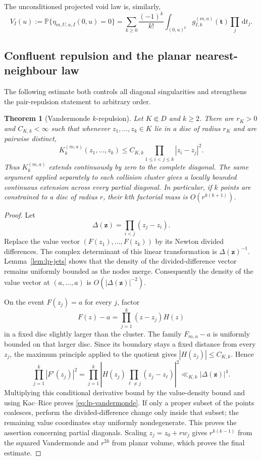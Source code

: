 \documentclass[11pt]{article}
\newtheorem{theorem}{Theorem}[section]
\theoremstyle{definition}
\theoremstyle{remark}
\newcommand{\dd}{\,\mathrm d}
\begin{document}
The unconditioned projected void law is, similarly,
\begin{equation}
 V_I(u):={\mathbb P}\{\eta_{m,U,a,I}(0,u)=0\}
 =\sum_{k\geq0}\frac{(-1)^k}{k!}
   \int_{(0,u)^k}g_{I,k}^{(m,a)}(\mathbf t)\prod_j\dd t_j.
 \label{eq:lp-projected-void}
\end{equation}

\subsection{Confluent repulsion and the planar nearest-neighbour law}

The following estimate both controls all diagonal singularities and strengthens
the pair-repulsion statement to arbitrary order.

\begin{theorem}[Vandermonde $k$-repulsion]
\label{thm:lp-vandermonde}
Let $K\Subset D$ and $k\geq2$.  There are $r_K>0$ and $C_{K,k}<\infty$ such
that whenever $z_1,\ldots,z_k\in K$ lie in a disc of radius $r_K$ and are
pairwise distinct,
\begin{equation}
 \boxed{
 K_k^{(m,a)}(z_1,\ldots,z_k)
 \leq C_{K,k}\prod_{1\leq i<j\leq k}|z_i-z_j|^2.
 }
 \label{eq:lp-vandermonde}
\end{equation}
Thus $K_k^{(m,a)}$ extends continuously by zero to the complete diagonal.  The
same argument applied separately to each collision cluster gives a locally
bounded continuous extension across every partial diagonal.  In particular,
if $k$ points are constrained to a disc of radius $r$, their $k$th factorial
mass is $O(r^{k(k+1)})$.
\end{theorem}

\begin{proof}
Let
\[
 \Delta(\mathbf z)=\prod_{i<j}(z_j-z_i).
\]
Replace the value vector $(F(z_1),\ldots,F(z_k))$ by its Newton divided
differences.  The complex determinant of this linear transformation is
$\Delta(\mathbf z)^{-1}$.  Lemma~\ref{lem:lp-jets} shows that the density of
the divided-difference vector remains uniformly bounded as the nodes merge.
Consequently the density of the value vector at $(a,\ldots,a)$ is
$O(|\Delta(\mathbf z)|^{-2})$.

On the event $F(z_j)=a$ for every $j$, factor
\[
 F(z)-a=\prod_{j=1}^k(z-z_j)H(z)
\]
in a fixed disc slightly larger than the cluster.  The family $F_{m,u}-a$ is
uniformly bounded on that larger disc.  Since its boundary stays a fixed
distance from every $z_j$, the maximum principle applied to the quotient gives
$|H(z_j)|\leq C_{K,k}$.  Hence
\[
 \prod_{j=1}^k|F'(z_j)|^2
 =\prod_{j=1}^k\left|
    H(z_j)\prod_{\ell\neq j}(z_j-z_\ell)
  \right|^2
 \ll_{K,k}|\Delta(\mathbf z)|^4.
\]
Multiplying this conditional derivative bound by the value-density bound and
using Kac--Rice proves \eqref{eq:lp-vandermonde}.  If only a proper subset of
the points coalesces, perform the divided-difference change only inside that
subset; the remaining value coordinates stay uniformly nondegenerate.  This
proves the assertion concerning partial diagonals.  Scaling
$z_j=z_0+rw_j$ gives $r^{k(k-1)}$ from the squared Vandermonde and $r^{2k}$
from planar volume, which proves the final estimate.
\end{proof}
\end{document}
